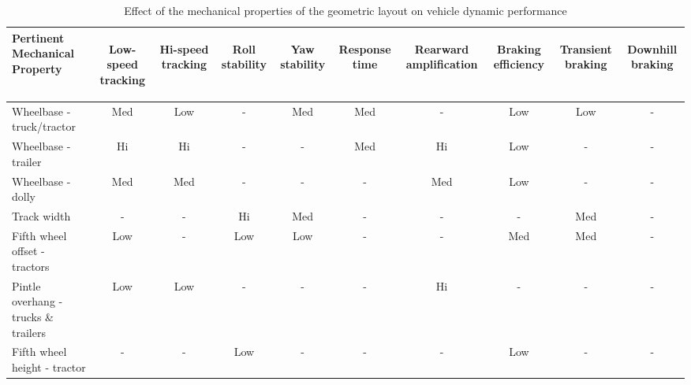 \begin{table}[H]
	\centering\footnotesize
	\begin{threeparttable}
	
        \begin{tabulary}{\textwidth}{lccccccccc}
            \toprule
            \textbf{Pertinent Mechanical Property} & \begin{sideways}\textbf{Low-speed tracking}\end{sideways} & \begin{sideways}\textbf{Hi-speed tracking}\end{sideways} & \begin{sideways}\textbf{Roll stability}\end{sideways} & \begin{sideways}\textbf{Yaw stability}\end{sideways} & \begin{sideways}\textbf{Response time}\end{sideways} & \begin{sideways}\textbf{Rearward amplification}\end{sideways} & \begin{sideways}\textbf{Braking efficiency}\end{sideways} & \begin{sideways}\textbf{Transient braking}\end{sideways} & \begin{sideways}\textbf{Downhill braking}\end{sideways} \\
            \midrule
            Wheelbase - truck/tractor & Med   & Low   & -     & Med   & Med   & -     & Low   & Low   & - \\
            Wheelbase - trailer & Hi    & Hi    & -     & -     & Med   & Hi    & Low   & -     & - \\
            Wheelbase - dolly & Med   & Med   & -     & -     & -     & Med   & Low   & -     & - \\
            Track width & -     & -     & Hi    & Med   & -     & -     & -     & Med   & - \\
            Fifth wheel offset - tractors & Low   & -     & Low   & Low   & -     & -     & Med   & Med   & - \\
            Pintle overhang - trucks \& trailers & Low   & Low   & -     & -     & -     & Hi    & -     & -     & - \\
            Fifth wheel height - tractor & -     & -     & Low   & -     & -     & -     & Low   & -     & -\\
            \bottomrule
		\end{tabulary}

		\caption{Effect of the mechanical properties of the geometric layout on vehicle dynamic performance}
		\label{table:effect-of-the-mechanical-properties-of-geometric-layout-on-vehicle-dynamic-performance}

	\end{threeparttable}
\end{table}
